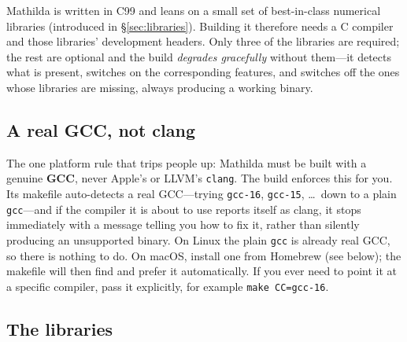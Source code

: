 Mathilda is written in C99 and leans on a small set of best-in-class numerical
libraries (introduced in \S\ref{sec:libraries}). Building it therefore needs a C
compiler and those libraries' development headers. Only three of the libraries are
required; the rest are optional and the build \emph{degrades gracefully} without
them---it detects what is present, switches on the corresponding features, and
switches off the ones whose libraries are missing, always producing a working
binary.

\subsection{A real GCC, not clang}
\label{sec:gcc-not-clang}

The one platform rule that trips people up: Mathilda must be built with a genuine
\textbf{GCC}, never Apple's or LLVM's \texttt{clang}. The build enforces this for
you. Its makefile auto-detects a real GCC---trying \texttt{gcc-16}, \texttt{gcc-15},
\ldots\ down to a plain \texttt{gcc}---and if the compiler it is about to use reports
itself as clang, it stops immediately with a message telling you how to fix it,
rather than silently producing an unsupported binary.%
On Linux the plain \texttt{gcc} is already real GCC, so there is nothing to do. On
macOS, install one from Homebrew (see below); the makefile will then find and prefer
it automatically. If you ever need to point it at a specific compiler, pass it
explicitly, for example \texttt{make CC=gcc-16}.

\subsection{The libraries}
\label{sec:libraries-list}

